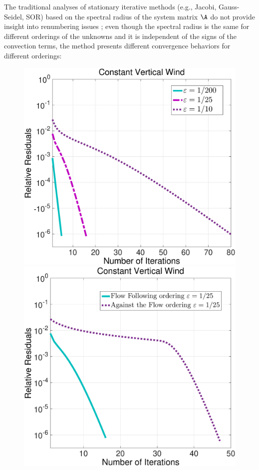 The traditional analyses of stationary iterative methods (e.g., Jacobi,
Gauss-Seidel, SOR) based on the spectral radius of the system matrix $\A$ do not
provide insight into renumbering issues \cite{Eie93}; even though the
spectral radius is the same for different orderings of the unknowns and it is
independent of the signs of the convection terms, the method presents different
convergence behaviors for different orderings:
\begin{figure}[h!]
\centering
\includegraphics[scale=0.21]{figures/bottom-to-top-GS-vertical-wind}
\includegraphics[scale=0.21]{figures/ordering-GS-vertical-wind_eps_25}

\end{figure}

